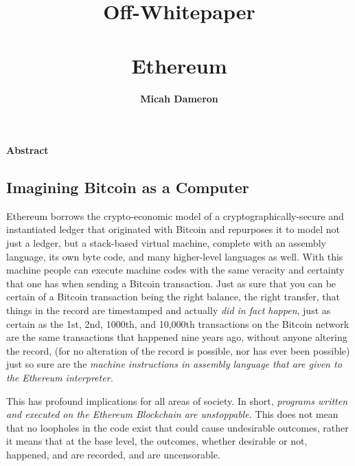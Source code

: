 \documentclass[10pt,a4paper,leqno,bibliography=totoc]{scrartcl}
\date{}
\author{\large{\textbf{Micah Dameron}}}
\title{\LARGE{Off-Whitepaper} \\ \hfill \\ \Large{Ethereum}}
\makeatletter
\let\mcnewpage=\newpage
\newcommand{\TrickSupertabularIntoMulticols}{%
\renewcommand\newpage{%
	      \if@firstcolumn
	            \hrule width\linewidth height0pt
          \columnbreak
      \else
        \mcnewpage
       \fi
  }%
 }
\newenvironment{alphafootnotes}
{\par\edef\savedfootnotenumber{\number\value{footnote}}
\renewcommand{\thefootnote}{\alph{footnote}}
\setcounter{footnote}{0}}
{\par\setcounter{footnote}{\savedfootnotenumber}}
\makeatother
\begin{document}

	\begin{alphafootnotes}

	\pagecolor{blanchedalmond}

	\maketitle

	\begin{center}\textbf{Abstract}\end{center}\par


	\begin{multicols*}{2}
	\TrickSupertabularIntoMulticols
	\begin{justify}
	
	
	\section{Imagining Bitcoin as a Computer}
		Ethereum borrows the crypto-economic model of a cryptographically-secure and instantiated ledger that originated with Bitcoin and repurposes it to model not just a ledger, but a stack-based virtual machine, complete with an assembly language, its own byte code, and many higher-level languages as well. With this machine people can execute machine codes with the same veracity and certainty that one has when sending a Bitcoin transaction. Just as sure that you can be certain of a Bitcoin transaction being the right balance, the right transfer, that things in the record are timestamped and actually \textit{did in fact happen}, just as certain as the 1st, 2nd, 1000th, and 10,000th transactions on the Bitcoin network are the same transactions that happened nine years ago, without anyone altering the record, (for no alteration of the record is possible, nor has ever been possible) just so sure are the \textit{machine instructions in assembly language that are given to the Ethereum interpreter.} \par
		
		This has profound implications for all areas of society. In short, \textit{programs written and executed on the Ethereum Blockchain are unstoppable.} This does not mean that no loopholes in the code exist that could cause undesirable outcomes, rather it means that at the base level, the outcomes, whether desirable or not, happened, and are recorded, and are uncensorable. 
	

\end{justify}
\end{multicols*}
\end{alphafootnotes}
\end{document}
